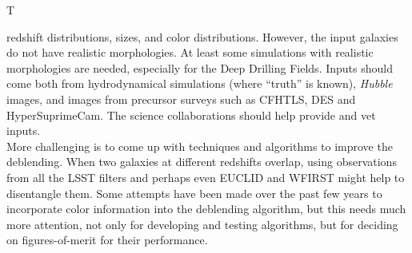 \begin{tasklist}{T}
\begin{task}
{redshift distributions, sizes, and color distributions. However, the
input galaxies do not have realistic morphologies. At least some simulations
with realistic morphologies are needed, especially for the Deep Drilling Fields. 
Inputs should come both from hydrodynamical simulations (where ``truth'' is known),
{\it Hubble} images, and images from precursor surveys such as CFHTLS, DES and HyperSuprimeCam.
The science collaborations should help provide and vet inputs. \\
More challenging is to come up with techniques and algorithms to improve the
deblending. When two galaxies at different redshifts overlap, using observations
from all the LSST filters and perhaps even EUCLID and WFIRST might 
help to disentangle them. Some attempts have been made over the past few years
to incorporate color information into the deblending algorithm, but this needs
much more attention, not only for developing and testing algorithms, but for
deciding on figures-of-merit for their performance.
}
\end{task}


\end{tasklist}
